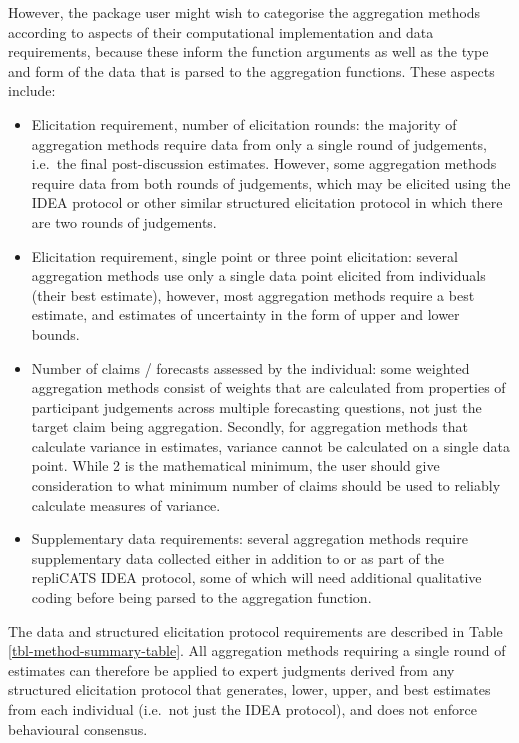 \documentclass[article]{jss}
\providecommand{\tightlist}{%
  \setlength{\itemsep}{0pt}\setlength{\parskip}{0pt}}\usepackage{longtable,booktabs,array}
\begin{document}
However, the  package user might wish to categorise the
aggregation methods according to aspects of their computational
implementation and data requirements, because these inform the function
arguments as well as the type and form of the data that is parsed to the
aggregation functions. These aspects include:

\begin{itemize}
\tightlist
\item
  Elicitation requirement, number of elicitation rounds: the majority of
  aggregation methods require data from only a single round of
  judgements, i.e.~the final post-discussion estimates. However, some
  aggregation methods require data from both rounds of judgements, which
  may be elicited using the IDEA protocol or other similar structured
  elicitation protocol in which there are two rounds of judgements.
\item
  Elicitation requirement, single point or three point elicitation:
  several aggregation methods use only a single data point elicited from
  individuals (their best estimate), however, most aggregation methods
  require a best estimate, and estimates of uncertainty in the form of
  upper and lower bounds.
\item
  Number of claims / forecasts assessed by the individual: some weighted
  aggregation methods consist of weights that are calculated from
  properties of participant judgements across multiple forecasting
  questions, not just the target claim being aggregation. Secondly, for
  aggregation methods that calculate variance in estimates, variance
  cannot be calculated on a single data point. While 2 is the
  mathematical minimum, the user should give consideration to what
  minimum number of claims should be used to reliably calculate measures
  of variance.
\item
  Supplementary data requirements: several aggregation methods require
  supplementary data collected either in addition to or as part of the
  repliCATS IDEA protocol, some of which will need additional
  qualitative coding before being parsed to the aggregation function.
\end{itemize}

The data and structured elicitation protocol requirements are described
in Table \ref{tbl-method-summary-table}. All aggregation methods
requiring a single round of estimates can therefore be applied to expert
judgments derived from any structured elicitation protocol that
generates, lower, upper, and best estimates from each individual
(i.e.~not just the IDEA protocol), and does not enforce behavioural
consensus.
\end{document}
